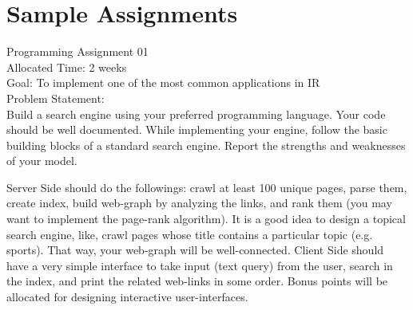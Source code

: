 \documentclass{article}
\begin{document}
\section{Sample Assignments}
\label{appA}
\begin{mdframed}[style=MyFrame]
\small
\label{Problem1}
Programming Assignment 01\\
Allocated Time: 2 weeks\\
Goal: To implement one of the most common applications in IR\\
Problem Statement:\\
Build a search engine using your preferred programming language. Your code should be well documented. While implementing your engine, follow the basic building blocks of a standard search engine. Report the strengths and weaknesses of your model.  
\par Server Side should do the followings: crawl at least 100 unique pages, parse them, create index, build web-graph by analyzing the links, and rank them (you may want to implement the page-rank algorithm). It is a good idea to design a topical search engine, like, crawl pages whose title contains a particular topic (e.g. sports). That way, your web-graph will be well-connected. Client Side should have a very simple interface to take input (text query) from the user, search in the index, and print the related web-links in some order. Bonus points will be allocated for designing interactive user-interfaces.  
\end{mdframed}
\end{document}
